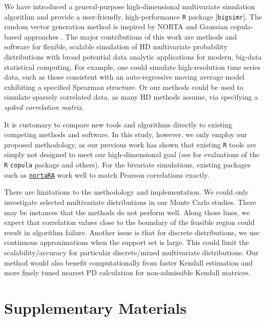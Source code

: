 \documentclass[
]{jss}
\begin{document}
We have introduced a general-purpose high-dimensional multivariate simulation algorithm and provide a user-friendly, high-performance \texttt{R} package {[}\texttt{bigsimr}{]}. The random vector generation method is inspired by NORTA \citep{Cario1997} and Gaussian copula-based approaches \citep[\citet{BF17}, \citet{Xia17}]{MB13}. The major contributions of this work are methods and software for flexible, scalable simulation of HD multivariate probability distributions with broad potential data analytic applications for modern, big-data statistical computing. For example, one could simulate high-resolution time series data, such as those consistent with an auto-regressive moving average model exhibiting a specified Spearman structure. Or our methods could be used to simulate sparsely correlated data, as many HD methods assume, via specifying a \emph{spiked correlation matrix}.

It is customary to compare new tools and algorithms directly to existing competing methods and software. In this study, however, we only employ our proposed methodology, as our previous work has shown that existing \texttt{R} tools are simply not designed to meet our high-dimensional goal (see \citet{Li2019gpu} for evaluations of the \texttt{R} \texttt{copula} package and others). For the bivariate simulations, existing packages such as \href{https://github.com/superdesolator/NORTARA}{\texttt{nortaRA}} work well to match Pearson correlations exactly.

There are limitations to the methodology and implementation. We could only investigate selected multivariate distributions in our Monte Carlo studies. There may be instances that the methods do not perform well. Along those lines, we expect that correlation values close to the boundary of the feasible region could result in algorithm failure. Another issue is that for discrete distributions, we use continuous approximations when the support set is large. This could limit the scalability/accuracy for particular discrete/mixed multivariate distributions. Our method would also benefit computationally from faster Kendall estimation and more finely tuned nearest PD calculation for non-admissible Kendall matrices.

\hypertarget{misc}{%
\section*{Supplementary Materials}\label{misc}}
\end{document}
